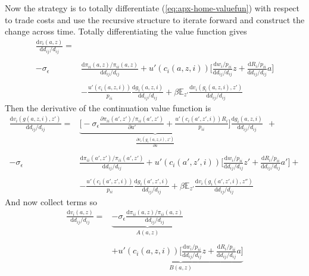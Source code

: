 \documentclass[12pt,pdftex]{article}
\begin{document}
\begin{onehalfspacing}
Now the strategy is to totally differentiate (\ref{eq:apx-home-valuefun}) with respect to trade costs and use the recursive structure to iterate forward and construct the change across time. Totally differentiating the value function gives
{\small
\begin{align}
\frac{\mathrm{d} v_i(a, z)}{\mathrm{d} d_{ij} / d_{ij}} =& \nonumber  \\
\nonumber \\
-\sigma_{\epsilon} & \frac{\mathrm{d} \pi_{ii}(a,z) / \pi_{ii}(a,z)}{\mathrm{d}d_{ij} / d_{ij}}  + u'(c_{i}(a,z,i)) \bigg[ \frac{\mathrm{d} w_{i} / p_{ii}}{\mathrm{d} d_{ij} / d_{ij}}z  +  \frac{\mathrm{d} R_{i} / p_{ii}}{\mathrm{d} d_{ij} / d_{ij}} a  \bigg] \\
\nonumber  \\
& - \frac{u'(c_{i}(a,z,i))}{p_{ii}}\frac{\mathrm{d} g_{i}(a,z,i)}{\mathrm{d} d_{ij} / d_{ij}} + \beta \mathbb{E}_{z'} \frac{\mathrm{d} v_i(g_{i}(a,z,i), z')}{\mathrm{d} d_{ij} / d_{ij}}
\end{align}
}
Then the derivative of the continuation value function is
{\small
\begin{align}
\frac{\mathrm{d} v_i(g(a,z,i), z')}{\mathrm{d} d_{ij} / d_{ij}} = &  \underbrace{\bigg [-\sigma_{\epsilon} \frac{\partial \pi_{ii}(a',z') / \pi_{ii}(a',z')}{\partial a'} + \frac{u'(c_{i}(a',z',i))R_{i}}{p_{ii}} \bigg ]}_{\frac{\partial v_i(g_{i}(a,z,i), z')}{\partial a}}\frac{\mathrm{d} g_{i}(a,z,i)}{\mathrm{d} d_{ij} / d_{ij}} \ \ + \\
\nonumber \\
-\sigma_{\epsilon} & \frac{\mathrm{d} \pi_{ii}(a',z') / \pi_{ii}(a',z')}{\mathrm{d}d_{ij} / d_{ij}}  + u'(c_{i}(a',z',i)) \bigg[ \frac{\mathrm{d} w_{i} / p_{ii}}{\mathrm{d} d_{ij} / d_{ij}}z'  +  \frac{\mathrm{d} R_{i} / p_{ii}}{\mathrm{d} d_{ij} / d_{ij}} a'  \bigg] + \\
\nonumber \\
& - \frac{u'(c_{i}(a',z',i))}{p_{ii}}\frac{\mathrm{d} g_{i}(a',z',i)}{\mathrm{d} d_{ij} / d_{ij}}
+ \beta \mathbb{E}_{z'} \frac{\mathrm{d} v_i(g_{i}(a',z',i), z'')}{\mathrm{d} d_{ij} / d_{ij}}
\end{align}
}
And now collect terms so
{\small
\begin{align}
\frac{\mathrm{d} v_i(a, z)}{\mathrm{d} d_{ij} / d_{ij}} =& \underbrace{-\sigma_{\epsilon} \frac{\mathrm{d} \pi_{ii}(a,z) / \pi_{ii}(a,z)}{\mathrm{d}d_{ij} / d_{ij}}}_{A(a,z)} \\
\nonumber \\
& + \underbrace{u'(c_{i}(a,z,i)) \bigg[ \frac{\mathrm{d} w_{i} / p_{ii}}{\mathrm{d} d_{ij} / d_{ij}}z  +  \frac{\mathrm{d} R_{i} / p_{ii}}{\mathrm{d} d_{ij} / d_{ij}} a  \bigg]}_{B(a,z)}  \\

\end{align}}
\end{onehalfspacing}
\end{document}
